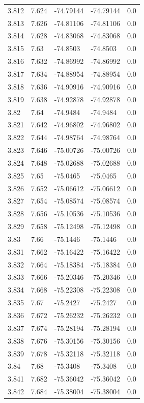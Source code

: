 \begin{tabular}{lllll}
3.812 & 7.624 & -74.79144 & -74.79144 & 0.0 \\
3.813 & 7.626 & -74.81106 & -74.81106 & 0.0 \\
3.814 & 7.628 & -74.83068 & -74.83068 & 0.0 \\
3.815 & 7.63 & -74.8503 & -74.8503 & 0.0 \\
3.816 & 7.632 & -74.86992 & -74.86992 & 0.0 \\
3.817 & 7.634 & -74.88954 & -74.88954 & 0.0 \\
3.818 & 7.636 & -74.90916 & -74.90916 & 0.0 \\
3.819 & 7.638 & -74.92878 & -74.92878 & 0.0 \\
3.82 & 7.64 & -74.9484 & -74.9484 & 0.0 \\
3.821 & 7.642 & -74.96802 & -74.96802 & 0.0 \\
3.822 & 7.644 & -74.98764 & -74.98764 & 0.0 \\
3.823 & 7.646 & -75.00726 & -75.00726 & 0.0 \\
3.824 & 7.648 & -75.02688 & -75.02688 & 0.0 \\
3.825 & 7.65 & -75.0465 & -75.0465 & 0.0 \\
3.826 & 7.652 & -75.06612 & -75.06612 & 0.0 \\
3.827 & 7.654 & -75.08574 & -75.08574 & 0.0 \\
3.828 & 7.656 & -75.10536 & -75.10536 & 0.0 \\
3.829 & 7.658 & -75.12498 & -75.12498 & 0.0 \\
3.83 & 7.66 & -75.1446 & -75.1446 & 0.0 \\
3.831 & 7.662 & -75.16422 & -75.16422 & 0.0 \\
3.832 & 7.664 & -75.18384 & -75.18384 & 0.0 \\
3.833 & 7.666 & -75.20346 & -75.20346 & 0.0 \\
3.834 & 7.668 & -75.22308 & -75.22308 & 0.0 \\
3.835 & 7.67 & -75.2427 & -75.2427 & 0.0 \\
3.836 & 7.672 & -75.26232 & -75.26232 & 0.0 \\
3.837 & 7.674 & -75.28194 & -75.28194 & 0.0 \\
3.838 & 7.676 & -75.30156 & -75.30156 & 0.0 \\
3.839 & 7.678 & -75.32118 & -75.32118 & 0.0 \\
3.84 & 7.68 & -75.3408 & -75.3408 & 0.0 \\
3.841 & 7.682 & -75.36042 & -75.36042 & 0.0 \\
3.842 & 7.684 & -75.38004 & -75.38004 & 0.0 \\

\end{tabular}
